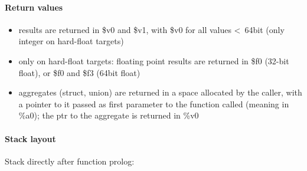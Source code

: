 \paragraph{Return values}

\begin{itemize}
\item results are returned in \$v0 and \$v1, with \$v0 for all values \textless\ 64bit (only integer on hard-float targets)
\item only on hard-float targets: floating point results are returned in \$f0 (32-bit float), or \$f0 and \$f3 (64bit float)
\item aggregates (struct, union) are returned in a space allocated by the caller, with a pointer to it
passed as first parameter to the function called (meaning in \%a0); the ptr to the aggregate is returned in \%v0
\end{itemize}

\paragraph{Stack layout}

Stack directly after function prolog:\\

